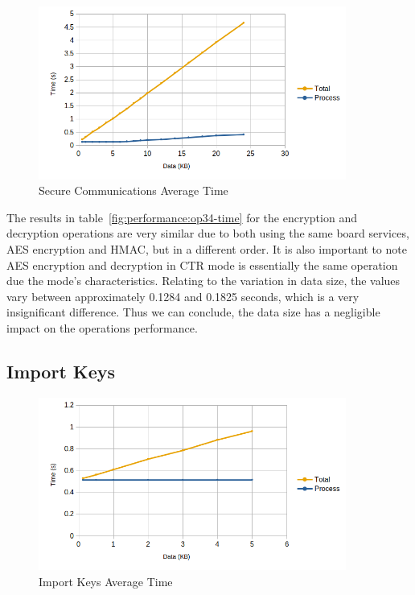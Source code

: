\begin{figure}[h!]
	\centering
	\includegraphics[width=0.9\textwidth]{./Images/encrypt-time.png}
	\caption{Secure Communications Average Time}
	\label{fig:performance:encrypt-time}
\end{figure}

The results in table~\ref{fig:performance:op34-time} for the encryption and decryption operations are very similar due to both using the same board services, AES encryption and HMAC, but in a different order. It is also important to note AES encryption and decryption in CTR mode is essentially the same operation due the mode's characteristics.
Relating to the variation in data size, the values vary between approximately 0.1284 and 0.1825 seconds, which is a very insignificant difference. Thus we can conclude, the data size has a negligible impact on the operations performance.

\subsection{Import Keys}\label{chap:evaluation:services:import-key}

\begin{figure}[h!]
	\centering
	\includegraphics[width=0.9\textwidth]{./Images/import-time.png}
	\caption{Import Keys Average Time}
	\label{fig:performance:import-time}
\end{figure}

